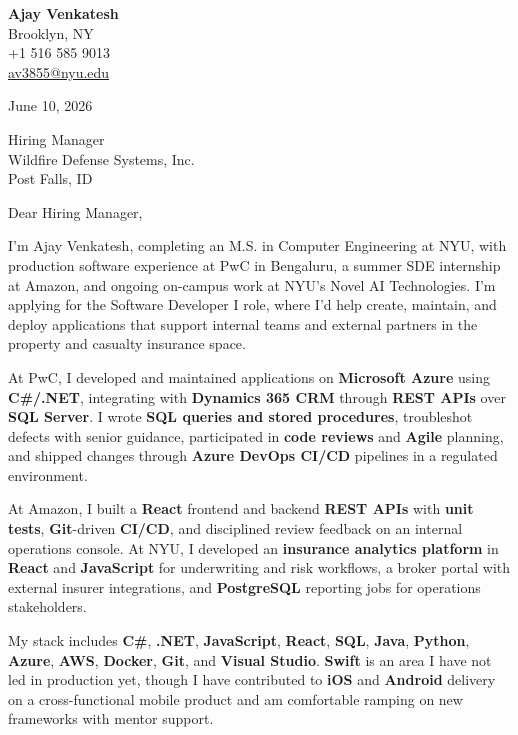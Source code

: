 \documentclass[letterpaper,11pt]{article}
\begin{document}
\begin{flushleft}
\textbf{\large Ajay Venkatesh} \\
Brooklyn, NY \\
+1 516 585 9013 \\
\href{mailto:av3855@nyu.edu}{av3855@nyu.edu}
\end{flushleft}
\vspace{10pt}
June 10, 2026
\vspace{6pt}

Hiring Manager \\
Wildfire Defense Systems, Inc. \\
Post Falls, ID

\vspace{10pt}

Dear Hiring Manager,

I'm Ajay Venkatesh, completing an M.S. in Computer Engineering at NYU, with production software experience at PwC in Bengaluru, a summer SDE internship at Amazon, and ongoing on-campus work at NYU's Novel AI Technologies. I'm applying for the Software Developer I role, where I'd help create, maintain, and deploy applications that support internal teams and external partners in the property and casualty insurance space.

At PwC, I developed and maintained applications on \textbf{Microsoft Azure} using \textbf{C\#/.NET}, integrating with \textbf{Dynamics 365 CRM} through \textbf{REST APIs} over \textbf{SQL Server}. I wrote \textbf{SQL queries and stored procedures}, troubleshot defects with senior guidance, participated in \textbf{code reviews} and \textbf{Agile} planning, and shipped changes through \textbf{Azure DevOps CI/CD} pipelines in a regulated environment.

At Amazon, I built a \textbf{React} frontend and backend \textbf{REST APIs} with \textbf{unit tests}, \textbf{Git}-driven \textbf{CI/CD}, and disciplined review feedback on an internal operations console. At NYU, I developed an \textbf{insurance analytics platform} in \textbf{React} and \textbf{JavaScript} for underwriting and risk workflows, a broker portal with external insurer integrations, and \textbf{PostgreSQL} reporting jobs for operations stakeholders.

My stack includes \textbf{C\#}, \textbf{.NET}, \textbf{JavaScript}, \textbf{React}, \textbf{SQL}, \textbf{Java}, \textbf{Python}, \textbf{Azure}, \textbf{AWS}, \textbf{Docker}, \textbf{Git}, and \textbf{Visual Studio}. \textbf{Swift} is an area I have not led in production yet, though I have contributed to \textbf{iOS} and \textbf{Android} delivery on a cross-functional mobile product and am comfortable ramping on new frameworks with mentor support.
\end{document}
